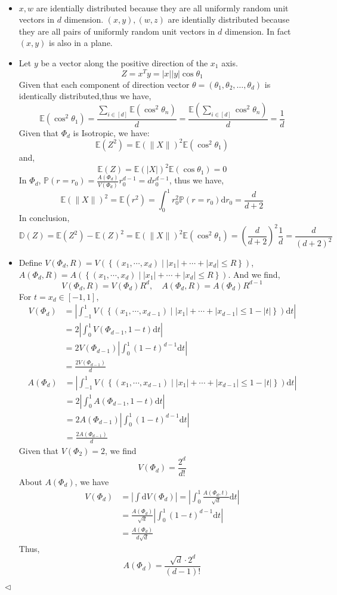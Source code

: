\documentclass[11pt]{article}
\newenvironment{answer}[1][Answer]{\begin{trivlist}
\item[\hskip \labelsep {\bfseries #1.}\hskip \labelsep]}{\hfill$\lhd$\end{trivlist}}
\begin{document}
\begin{answer} ~
\begin{itemize}
    \item [(1)] 
$x,w$ are identially distributed because they are all uniformly random unit vectors in $d$ dimension.
$(x,y), (w,z)$ are identially distributed because they are all pairs of uniformly random unit vectors in $d$ dimension. In fact $(x,y)$ is also in a plane.
    \item [(2)] 
Let $y$ be a vector along the positive direction of the $x_1$ axis.
$$Z=x^Ty=|x||y|\cos\theta_1$$
Given that each component of direction vector $\theta=(\theta_1,\theta_2,\dots,\theta_d)$ is identically distributed,thus we have,
$$\mathbb E(\cos^2 \theta_1)=\frac{\sum_{i\in [d]}\mathbb E(\cos^2\theta_n)}{d}=\frac{\mathbb E(\sum_{i\in [d]} \cos^2\theta_n)}{d}=\frac{1}{d}$$
Given that $\Phi_d$ is Isotropic, we have:
$$\mathbb E(Z^2)=\mathbb E(\|X\|)^2\mathbb E(\cos^2\theta_1)$$
and,
$$\mathbb E(Z)=\mathbb E(|X|)^2\mathbb E(\cos\theta_1)=0$$
In $\Phi_d$, $\mathbb P(r=r_0)=\frac{A(\Phi_d)}{V(\Phi_d)}r_0^{d-1}=dr_0^{d-1}$, thus we have,
$$\mathbb E(\|X\|)^2=\mathbb E(r^2)=\int_{0}^{1}r_0^2\mathbb P(r=r_0)\mathrm dr_0=\frac{d}{d+2}$$
In conclusion,
$$\mathbb D(Z)= \mathbb E(Z^2)-\mathbb E(Z)^2=\mathbb E(\|X\|)^2\mathbb E(\cos^2\theta_1)=\left(\frac{d}{d+2}\right)^2\frac{1}{d}=\frac{d}{(d+2)^2}$$
    \item [(3)]
Define $V(\Phi_d,R)=V(\left\{(x_1,\cdots,x_d)\mid |x_1|+\cdots+|x_d|\leq R\right\})$, $A(\Phi_d,R)=A(\left\{(x_1,\cdots,x_d)\mid |x_1|+\cdots+|x_d|\leq R\right\})$. And we find,
$$V(\Phi_d,R)=V(\Phi_d)R^d,\quad A(\Phi_d,R)=A(\Phi_d)R^{d-1}$$
For $t=x_d\in [-1,1]$,
$$\begin{align*}V(\Phi_d)&=\left|\int_{-1}^{1}V(\left\{(x_1,\cdots,x_{d-1})\mid |x_1|+\cdots+|x_{d-1}|\leq 1-|t|\right\})\mathrm dt \right|\\ &= 2\left|\int_{0}^1 V(\Phi_{d-1},1-t)\mathrm dt\right|\\&=2V(\Phi_{d-1})\left|\int_{0}^{1}(1-t)^{d-1}\mathrm dt \right|\\&=\frac{2V(\Phi_{d-1})}{d}\end{align*}$$
$$\begin{align*}A(\Phi_d)&=\left|\int_{-1}^{1}V(\left\{(x_1,\cdots,x_{d-1})\mid |x_1|+\cdots+|x_{d-1}|\leq 1-|t|\right\})\mathrm dt \right|\\ &= 2\left|\int_{0}^1 A(\Phi_{d-1},1-t)\mathrm dt\right|\\&=2A(\Phi_{d-1})\left|\int_{0}^{1}(1-t)^{d-1}\mathrm dt \right|\\&=\frac{2A(\Phi_{d-1})}{d}\end{align*}$$
Given that $V(\Phi_{2})=2$, we find
$$V(\Phi_d)=\frac{2^d}{d!}$$
About $A(\Phi_d)$, we have
$$\begin{align*}V(\Phi_d)&=\left|\int\mathrm dV(\Phi_d) \right|=\left|\int_{0}^{1}\frac{A(\Phi_d,t)}{\sqrt{d}}\mathrm dt \right|\\ &=\frac{A(\Phi_{d})}{\sqrt{d}}\left|\int_{0}^{1}(1-t)^{d-1}\mathrm dt \right|\\&=\frac{A(\Phi_{d})}{d\sqrt{d}}\end{align*}$$
Thus, 
$$A(\Phi_d)=\frac{\sqrt{d}\cdot 2^{d}}{(d-1)!}$$
\end{itemize}
\end{answer}
\end{document}
